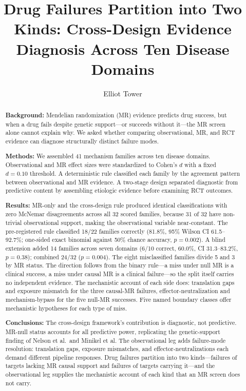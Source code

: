 \documentclass[11pt]{article}
\title{Drug Failures Partition into Two Kinds: Cross-Design Evidence Diagnosis Across Ten Disease Domains}
\author{Elliot Tower}
\affil{Independent researcher \\ \texttt{elliot@elliottower.ai}}
\date{}
\begin{document}
\maketitle

\begin{abstract}
\textbf{Background:}
Mendelian randomization (MR) evidence predicts drug success, but when a drug fails despite genetic support---or succeeds without it---the MR screen alone cannot explain why. We asked whether comparing observational, MR, and RCT evidence can diagnose structurally distinct failure modes.

\textbf{Methods:}
We assembled 41 mechanism families across ten disease domains. Observational and MR effect sizes were standardized to Cohen's $d$ with a fixed $d = 0.10$ threshold. A deterministic rule classified each family by the agreement pattern between observational and MR evidence. A two-stage design separated diagnostic from predictive content by assembling etiologic evidence before examining RCT outcomes.

\textbf{Results:}
MR-only and the cross-design rule produced identical classifications with zero McNemar disagreements across all 32 scored families, because 31 of 32 have non-trivial observational support, making the observational variable near-constant. The pre-registered rule classified 18/22 families correctly (81.8\%, 95\% Wilson CI 61.5--92.7\%; one-sided exact binomial against 50\% chance accuracy, $p = 0.002$). A blind extension added 14 families across seven domains (6/10 correct, 60.0\%, CI 31.3--83.2\%, $p = 0.38$); combined 24/32 ($p = 0.004$). The eight misclassified families divide 5 and 3 by MR status. The direction follows from the binary rule---a miss under null MR is a clinical success, a miss under causal MR is a clinical failure---so the split itself carries no independent evidence. The mechanistic account of each side does: translation gaps and exposure mismatch for the three causal-MR failures, effector-neutralization and mechanism-bypass for the five null-MR successes. Five named boundary classes offer mechanistic hypotheses for each type of miss.

\textbf{Conclusions:}
The cross-design framework's contribution is diagnostic, not predictive. MR-null status accounts for all predictive power, replicating the genetic-support finding of Nelson et al.\ and Minikel et al. The observational leg adds failure-mode resolution: translation gaps, exposure mismatches, and effector-neutralizations each demand different pipeline responses. Drug failures partition into two kinds---failures of targets lacking MR causal support and failures of targets carrying it---and the observational leg supplies the mechanistic account of each kind that an MR screen does not carry.
\end{abstract}
\end{document}
